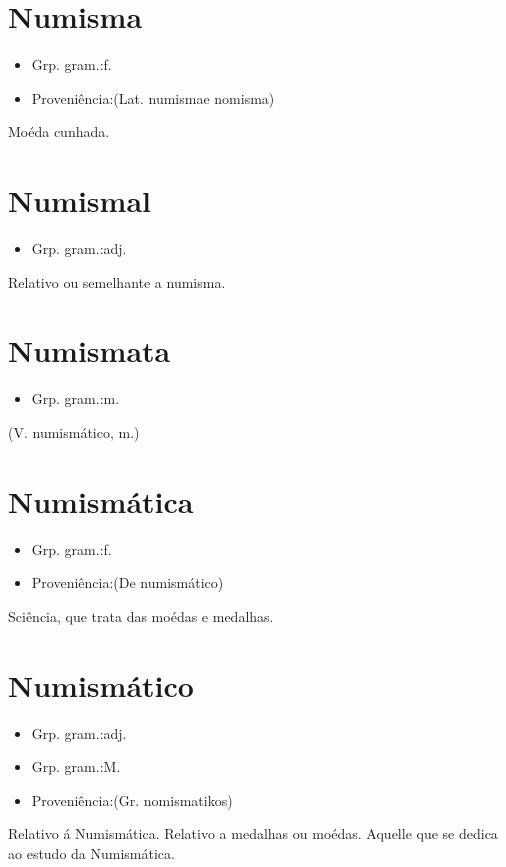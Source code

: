\section{Numisma}
\begin{itemize}
\item {Grp. gram.:f.}
\end{itemize}
\begin{itemize}
\item {Proveniência:(Lat. \textunderscore numisma\textunderscore  e \textunderscore nomisma\textunderscore )}
\end{itemize}
Moéda cunhada.
\section{Numismal}
\begin{itemize}
\item {Grp. gram.:adj.}
\end{itemize}
Relativo ou semelhante a numisma.
\section{Numismata}
\begin{itemize}
\item {Grp. gram.:m.}
\end{itemize}
(V. \textunderscore numismático\textunderscore , m.)
\section{Numismática}
\begin{itemize}
\item {Grp. gram.:f.}
\end{itemize}
\begin{itemize}
\item {Proveniência:(De \textunderscore numismático\textunderscore )}
\end{itemize}
Sciência, que trata das moédas e medalhas.
\section{Numismático}
\begin{itemize}
\item {Grp. gram.:adj.}
\end{itemize}
\begin{itemize}
\item {Grp. gram.:M.}
\end{itemize}
\begin{itemize}
\item {Proveniência:(Gr. \textunderscore nomismatikos\textunderscore )}
\end{itemize}
Relativo á Numismática.
Relativo a medalhas ou moédas.
Aquelle que se dedica ao estudo da Numismática.
